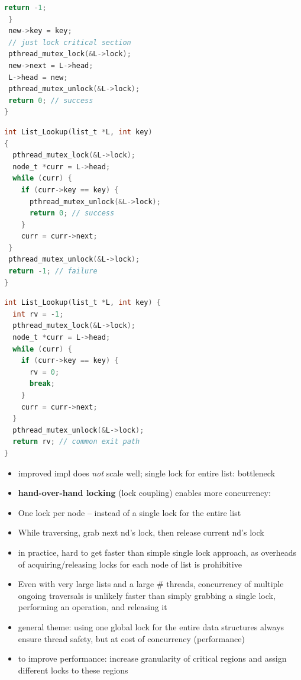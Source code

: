 \documentclass[8pt,a4paper,landscape]{extarticle}
\begin{document}
\begin{multicols*}{3}
\begin{minipage}{.53\linewidth}
\begin{lstlisting}[language=c,xleftmargin=2pt]
    return -1;
 }
 new->key = key;
 // just lock critical section
 pthread_mutex_lock(&L->lock);
 new->next = L->head;
 L->head = new;
 pthread_mutex_unlock(&L->lock);
 return 0; // success
}
\end{lstlisting}
\end{minipage}
\begin{minipage}{.53\linewidth}
\begin{lstlisting}[language=c,xleftmargin=-4pt]
int List_Lookup(list_t *L, int key)
{
  pthread_mutex_lock(&L->lock);
  node_t *curr = L->head;
  while (curr) {
    if (curr->key == key) {
      pthread_mutex_unlock(&L->lock);
      return 0; // success
    }
    curr = curr->next;
 }
 pthread_mutex_unlock(&L->lock);
 return -1; // failure
}
\end{lstlisting}
\end{minipage}
\begin{minipage}{.53\linewidth}
\begin{lstlisting}[language=c,xleftmargin=2pt]
int List_Lookup(list_t *L, int key) {
  int rv = -1;
  pthread_mutex_lock(&L->lock);
  node_t *curr = L->head;
  while (curr) {
    if (curr->key == key) {
      rv = 0;
      break;
    }
    curr = curr->next;
  }
  pthread_mutex_unlock(&L->lock);
  return rv; // common exit path
}
\end{lstlisting}
\end{minipage}
\begin{itemize}
\item improved impl does \emph{not} scale well; single lock for entire list: bottleneck
\item \textbf{hand-over-hand locking} (lock coupling) enables more concurrency:
\item One lock per node – instead of a single lock for the entire list
\item While traversing, grab next nd's lock, then release current nd's lock
\item in practice, hard to get faster than simple single lock approach, as overheads of acquiring/releasing locks for each node of list is prohibitive
\item Even with very large lists and a large \# threads, concurrency of multiple ongoing traversals is unlikely faster than simply grabbing a single lock, performing an operation, and releasing it
\item general theme: using one global lock for the entire data structures always ensure thread safety, but at cost of concurrency (performance)
\item to improve performance: increase granularity of critical regions and assign different locks to these regions
\end{itemize}

\end{multicols*}
\end{document}
